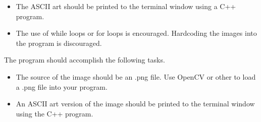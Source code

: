 \documentclass[12pt]{article}
\begin{document}
\begin{description}[labelindent=1cm]
\begin{itemize}

	\item The ASCII art should be printed to the terminal window using a C++ program.

	\item The use of while loops or for loops is encouraged. Hardcoding the images into the program is discouraged.
	
\end{itemize}

\item[\textbf{\underline{Program Additional Requirements:}}] \hfill \vspace{0mm}

The program should accomplish the following tasks. 

\begin{itemize}
	
	\item The source of the image should be an .png file. Use OpenCV or other to load a .png file into your program. 
	
	\item An ASCII art version of the image should be printed to the terminal window using the C++ program.

	
\end{itemize}

\newpage

%
%	
%
%
%
%	
%	
%	
%	
%	
%	
%
%
%		

	\item[\textbf{\underline{Part 3 - Testing:}}] \hfill \vspace{0mm}
	\begin{enumerate}
	

\end{enumerate}
\end{description}
\end{document}

